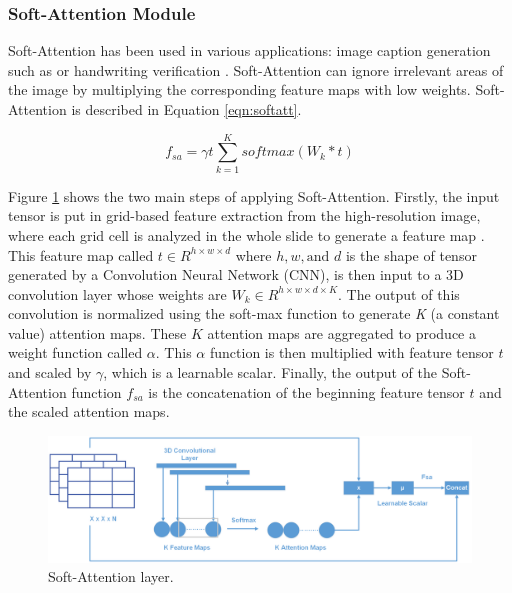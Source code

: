 \documentclass[sensors,article,accept,pdftex,moreauthors]{Definitions/mdpi}
\begin{document}
	\subsubsection{Soft-Attention Module}
	Soft-Attention has been used in various applications: image caption generation such as \cite{03044} or handwriting verification \cite{202017}. Soft-Attention can ignore irrelevant areas of the image by multiplying the corresponding feature maps with low weights. Soft-Attention is described in {Equation}
	\eqref{eqn:softatt}. %
	
	\begin{equation}
		\label{eqn:softatt}
		f_{sa} = \gamma t\sum_{k=1}^{K}softmax(W_k * t)
	\end{equation}
	
	Figure \ref{fig:soft-attention} shows the two main steps of applying Soft-Attention. Firstly, the input tensor is put in grid-based feature extraction from the high-resolution image, where each grid cell is analyzed in the whole slide to generate a feature map \cite{08513}. This feature map called $t \in R^{h \times w \times d}$ where $h, w, \text{and } d$ is the shape of tensor generated by a Convolution Neural Network (CNN), is then input to a 3D convolution layer whose weights are $W_k \in R^{h \times w \times d \times K}$. The output of this convolution is normalized using the soft-max function to generate {\textit{K}} %
 (a constant value) attention maps. These $\textit{K}$ attention maps are aggregated to produce a weight function called $\alpha$. This $\alpha$ function is then multiplied with feature tensor $t$ and scaled by $\gamma$, which is a learnable scalar. Finally, the output of the Soft-Attention function $f_{sa}$ is the concatenation of the beginning feature tensor $t$ and the scaled attention maps. 
	
	\begin{figure}[H]
		\includegraphics[width=1\linewidth]{Definitions/SoftAttention}
		\caption{{Soft-Attention layer.} %
}
		\label{fig:soft-attention}
	\end{figure}
	
\end{document}
